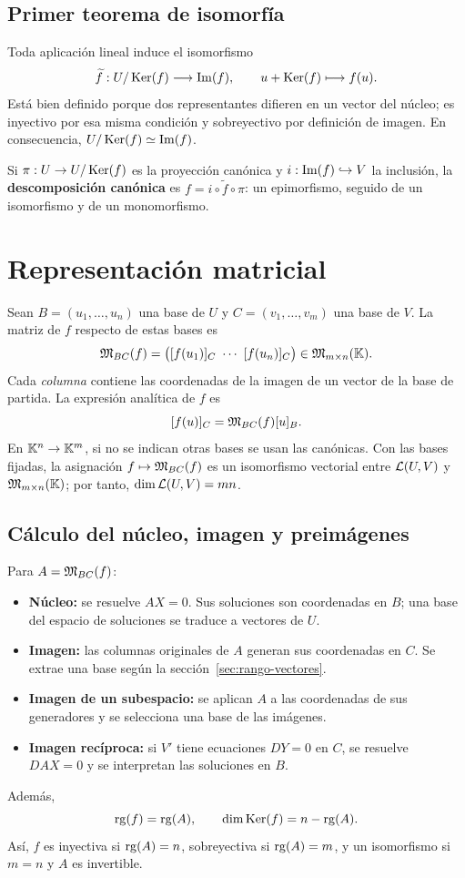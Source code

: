 \subsection*{Primer teorema de isomorfía}
\label{sec:isomorfia}

Toda aplicación lineal induce el isomorfismo
\[
 \widetilde f:U/\operatorname{Ker}(f)\longrightarrow\operatorname{Im}(f),\qquad
 u+\operatorname{Ker}(f)\longmapsto f(u).
\]
Está bien definido porque dos representantes difieren en un vector del
núcleo; es inyectivo por esa misma condición y sobreyectivo por definición
de imagen. En consecuencia, $U/\operatorname{Ker}(f)\simeq\operatorname{Im}(f)$.

Si $\pi:U\to U/\operatorname{Ker}(f)$ es la proyección canónica y
$i:\operatorname{Im}(f)\hookrightarrow V$ la inclusión, la
\textbf{descomposición canónica} es $f=i\circ\widetilde f\circ\pi$:
un epimorfismo, seguido de un isomorfismo y de un monomorfismo.

\section{Representación matricial}
\label{sec:matriz-lineal}

Sean $B=(u_1,\ldots,u_n)$ una base de $U$ y
$C=(v_1,\ldots,v_m)$ una base de $V$. La matriz de $f$ respecto de
estas bases es
\[
 \M_{BC}(f)=\bigl(\coord{f(u_1)}{C}\ \cdots\ \coord{f(u_n)}{C}\bigr)
 \in\M_{m\times n}(\K).
\]
Cada \emph{columna} contiene las coordenadas de la imagen de un vector
de la base de partida. La expresión analítica de $f$ es
\[
 [f(u)]_{C}=\mathfrak{M}_{BC}(f)[u]_{B}.
\]
En $\mathbb{K}^n\to\mathbb{K}^m$, si no se indican otras bases se usan las canónicas.
Con las bases fijadas, la asignación $f\mapsto\mathfrak{M}_{BC}(f)$ es un
isomorfismo vectorial entre $\mathcal{L}(U,V)$ y $\mathfrak{M}_{m\times n}(\mathbb{K})$;
por tanto, $\dim\mathcal{L}(U,V)=mn$.

\subsection*{Cálculo del núcleo, imagen y preimágenes}

Para $A=\mathfrak{M}_{BC}(f)$:
\begin{itemize}
 \item \textbf{Núcleo:} se resuelve $AX=0$. Sus soluciones son coordenadas
       en $B$; una base del espacio de soluciones se traduce a vectores de $U$.
 \item \textbf{Imagen:} las columnas originales de $A$ generan sus coordenadas
       en $C$. Se extrae una base según la sección~\ref{sec:rango-vectores}.
 \item \textbf{Imagen de un subespacio:} se aplican $A$ a las coordenadas
       de sus generadores y se selecciona una base de las imágenes.
 \item \textbf{Imagen recíproca:} si $V'$ tiene ecuaciones $DY=0$ en $C$,
       se resuelve $DAX=0$ y se interpretan las soluciones en $B$.
\end{itemize}
Además,
\[
 \operatorname{rg}(f)=\operatorname{rg}(A),\qquad \dim\operatorname{Ker}(f)=n-\operatorname{rg}(A).
\]
Así, $f$ es inyectiva si $\operatorname{rg}(A)=n$, sobreyectiva si $\operatorname{rg}(A)=m$,
y un isomorfismo si $m=n$ y $A$ es invertible.

